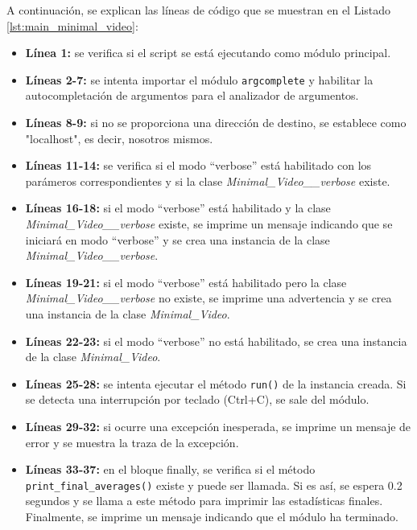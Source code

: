A continuación, se explican las líneas de código que se muestran en el Listado \ref{lst:main_minimal_video}:
\begin{itemize}
    \item \textbf{Línea 1:} se verifica si el script se está ejecutando como módulo principal.
    \item \textbf{Líneas 2-7:} se intenta importar el módulo \texttt{argcomplete} y habilitar la autocompletación de argumentos para el analizador de argumentos.
    \item \textbf{Líneas 8-9:} si no se proporciona una dirección de destino, se establece como "localhost", es decir, nosotros mismos.
    \item \textbf{Líneas 11-14:} se verifica si el modo ``verbose'' está habilitado con los parámeros correspondientes y si la clase \textit{Minimal\_Video\_\_verbose} existe.
    \item \textbf{Líneas 16-18:} si el modo ``verbose'' está habilitado y la clase \textit{Minimal\_Video\_\_verbose} existe, se imprime un mensaje indicando que se iniciará en modo ``verbose'' y se crea una instancia de la clase \textit{Minimal\_Video\_\_verbose}.
    \item \textbf{Líneas 19-21:} si el modo ``verbose'' está habilitado pero la clase \textit{Minimal\_Video\_\_verbose} no existe, se imprime una advertencia y se crea una instancia de la clase \textit{Minimal\_Video}.
    \item \textbf{Líneas 22-23:} si el modo ``verbose'' no está habilitado, se crea una instancia de la clase \textit{Minimal\_Video}.
    \item \textbf{Líneas 25-28:} se intenta ejecutar el método \texttt{run()} de la instancia creada. Si se detecta una interrupción por teclado (Ctrl+C), se sale del módulo.
    \item \textbf{Líneas 29-32:} si ocurre una excepción inesperada, se imprime un mensaje de error y se muestra la traza de la excepción.
    \item \textbf{Líneas 33-37:} en el bloque finally, se verifica si el método \texttt{print\_final\_averages()} existe y puede ser llamada. Si es así, se espera 0.2 segundos y se llama a este método para imprimir las estadísticas finales. Finalmente, se imprime un mensaje indicando que el módulo ha terminado.
\end{itemize}
\vspace{\baselineskip}

\newpage

